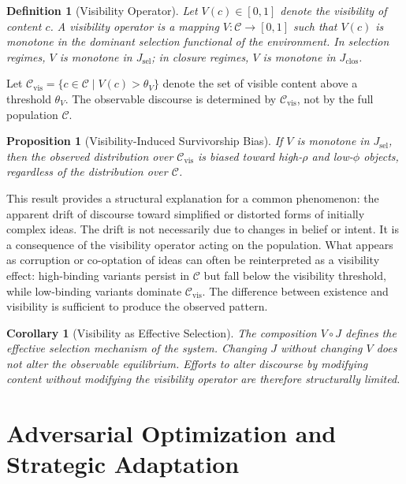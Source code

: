 \documentclass[12pt]{article}
\newtheorem{corollary}{Corollary}[theorem]
\newtheorem{proposition}{Proposition}[section]
\newtheorem{definition}{Definition}[section]
\newcommand{\bind}{\phi}
\newcommand{\recomp}{\rho}
\newcommand{\Jsel}{J_{\mathrm{sel}}}
\newcommand{\Jclos}{J_{\mathrm{clos}}}
\begin{document}
\begin{definition}[Visibility Operator]
\label{def:visibility}
Let $V(c) \in [0,1]$ denote the visibility of content $c$. A visibility
operator is a mapping $V: \mathcal{C} \to [0,1]$ such that $V(c)$ is
monotone in the dominant selection functional of the environment. In
selection regimes, $V$ is monotone in $\Jsel$; in closure regimes, $V$
is monotone in $\Jclos$.
\end{definition}

Let $\mathcal{C}_{\mathrm{vis}} = \{ c \in \mathcal{C} \mid V(c) >
\theta_V \}$ denote the set of visible content above a threshold
$\theta_V$. The observable discourse is determined by
$\mathcal{C}_{\mathrm{vis}}$, not by the full population $\mathcal{C}$.

\begin{proposition}[Visibility-Induced Survivorship Bias]
\label{prop:survivorship}
If $V$ is monotone in $\Jsel$, then the observed distribution over
$\mathcal{C}_{\mathrm{vis}}$ is biased toward high-$\recomp$ and
low-$\bind$ objects, regardless of the distribution over $\mathcal{C}$.
\end{proposition}

This result provides a structural explanation for a common phenomenon:
the apparent drift of discourse toward simplified or distorted forms of
initially complex ideas. The drift is not necessarily due to changes in
belief or intent. It is a consequence of the visibility operator acting
on the population. What appears as corruption or co-optation of ideas
can often be reinterpreted as a visibility effect: high-binding variants
persist in $\mathcal{C}$ but fall below the visibility threshold, while
low-binding variants dominate $\mathcal{C}_{\mathrm{vis}}$. The
difference between existence and visibility is sufficient to produce the
observed pattern.

\begin{corollary}[Visibility as Effective Selection]
The composition $V \circ J$ defines the effective selection mechanism
of the system. Changing $J$ without changing $V$ does not alter the
observable equilibrium. Efforts to alter discourse by modifying content
without modifying the visibility operator are therefore structurally
limited.
\end{corollary}

\section{Adversarial Optimization and Strategic Adaptation}
\label{sec:adversarial}
\end{document}
